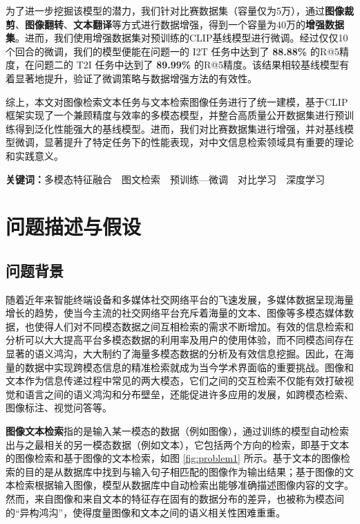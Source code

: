 \documentclass[a4paper]{zreport}
\begin{document}
为了进一步挖掘该模型的潜力，我们针对比赛数据集（容量仅为5万），通过\textbf{图像裁剪}、\textbf{图像翻转}、\textbf{文本翻译}等方式进行数据增强，得到一个容量为40万的\textbf{增强数据集}。进而，我们使用增强数据集对预训练的CLIP基线模型进行微调。经过仅仅10个回合的微调，我们的模型便能在问题一的 I2T 任务中达到了 \textbf{88.88\%} 的R@5精度，在问题二的 T2I 任务中达到了 \textbf{89.99\%} 的R@5精度。该结果相较基线模型有着显著地提升，验证了微调策略与数据增强方法的有效性。

综上，本文对图像检索文本任务与文本检索图像任务进行了统一建模，基于CLIP框架实现了一个兼顾精度与效率的多模态模型，并整合高质量公开数据集进行预训练得到泛化性能强大的基线模型。进而，我们对比赛数据集进行增强，并对基线模型微调，显著提升了特定任务下的性能表现，对中文信息检索领域具有重要的理论和实践意义。


\vspace{0.5em}

\textbf{关键词：}\medspace 多模态特征融合~~图文检索~~预训练—微调~~对比学习~~深度学习

\setcounter{page}{1}
\tableofcontents
\newpage

\setcounter{page}{1}

\linespread{1.5}

\section{问题描述与假设}

\subsection{问题背景}

随着近年来智能终端设备和多媒体社交网络平台的飞速发展，多媒体数据呈现海量增长的趋势，使当今主流的社交网络平台充斥着海量的文本、图像等多模态媒体数据，也使得人们对不同模态数据之间互相检索的需求不断增加。有效的信息检索和分析可以大大提高平台多模态数据的利用率及用户的使用体验，而不同模态间存在显著的语义鸿沟，大大制约了海量多模态数据的分析及有效信息挖掘。因此，在海量的数据中实现跨模态信息的精准检索就成为当今学术界面临的重要挑战。图像和文本作为信息传递过程中常见的两大模态，它们之间的交互检索不仅能有效打破视觉和语言之间的语义鸿沟和分布壁垒，还能促进许多应用的发展，如跨模态检索、图像标注、视觉问答等。

\textbf{图像文本检索}指的是输入某一模态的数据（例如图像），通过训练的模型自动检索出与之最相关的另一模态数据（例如文本），它包括两个方向的检索，即基于文本的图像检索和基于图像的文本检索，如图 \ref{fig:problem1} 所示。基于文本的图像检索的目的是从数据库中找到与输入句子相匹配的图像作为输出结果；基于图像的文本检索根据输入图像，模型从数据库中自动检索出能够准确描述图像内容的文字。然而，来自图像和来自文本的特征存在固有的数据分布的差异，也被称为模态间的“异构鸿沟”，使得度量图像和文本之间的语义相关性困难重重。
\end{document}
